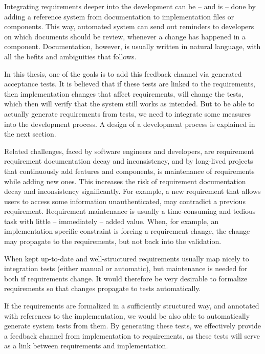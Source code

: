 \noindent Integrating requirements deeper into the development can be -- and is -- done by adding a reference system from documentation to implementation files or components. This way, automated system can send out reminders to developers on which documents should be review, whenever a change has happened in a component.
Documentation, however, is usually written in natural language, with all the befits and ambiguities that follows.\bigskip

\noindent In this thesis, one of the goals is to add this feedback channel via generated acceptance tests. It is believed that if these tests are linked to the requirements, then implementation changes that affect requirements, will change the tests, which then will verify that the system still works as intended. But to be able to actually generate requirements from tests, we need to integrate some measures into the development process. A design of a development process is explained in the next section.\bigskip

\noindent Related challenges, faced by software engineers and developers, are requirement requirement documentation decay and inconsistency, and  by long-lived projects that continuously add features and components, is maintenance of requirements while adding new ones. This increases the risk of requirement documentation decay and inconsistency significantly. For example, a new requirement that allows users to access some information unauthenticated, may contradict a previous requirement.
Requirement maintenance is usually a time-consuming and tedious task with little -- immediately -- added value. When, for example, an implementation-specific constraint is forcing a requirement change, the change may propagate to the requirements, but not back into the validation.\medskip

\noindent When kept up-to-date and well-structured requirements usually map nicely to integration tests (either manual or automatic), but maintenance is needed for both if requirements change. It would therefore be very desirable to formalize requirements so that changes propagate to tests automatically.\medskip

\noindent If the requirements are formalized in a sufficiently structured way, and annotated with references to the implementation, we would be also able to automatically generate system tests from them. By generating these tests, we effectively provide a feedback channel from implementation to requirements, as these tests will serve as a link between requirements and implementation.\medskip

